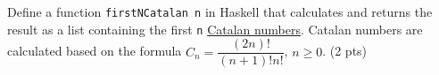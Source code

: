 \documentclass [11pt, a4wide, twoside]{article}
\begin{document}
\begin{myitemize}
\item Define a function \texttt{firstNCatalan n} in Haskell that calculates and returns the result as a list containing the first \texttt{n} \href{https://en.wikipedia.org/wiki/Catalan_number}{Catalan numbers}. Catalan numbers are calculated based on the formula \mbox{$C_{n} = \dfrac{(2n)!}{(n+1)!n!}$,} $n \ge 0$. (2 pts)

\vspace{0.2cm}

\end{myitemize}
\end{document}
